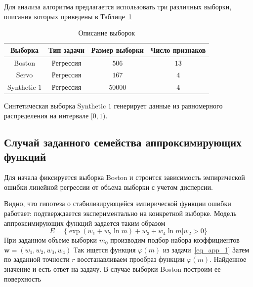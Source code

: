 \documentclass[12pt, twoside]{article}
\begin{document}
Для анализа алгоритма предлагается использовать три различных выборки, описания которых приведены в Таблице~\ref{table:sample}
\begin{table}[H]
\begin{center}
\caption{Описание выборок}
\begin{tabular}{|c|c|c|c|}
\hline
Выборка & Тип задачи & Размер выборки & Число признаков \\
\hline
Boston & Регрессия & $506$ & $13$ \\
\hline
Servo & Регрессия & $167$ & $4$ \\
\hline
Synthetic $1$ & Регрессия & $50000$ & $4$ \\
\hline
\end{tabular}
\label{table:sample}
\end{center}
\end{table}
Синтетическая выборка Synthetic $1$ генерирует данные из равномерного распределения на интервале $[0,1)$.
\subsection{Случай заданного семейства аппроксимирующих функций}
Для начала фиксируется выборка Boston и строится зависимость эмпирической ошибки линейной регрессии от объема выборки с учетом дисперсии. 

\begin{figure}[!htb]
\end{figure}

Видно, что гипотеза о стабилизирующейся эмпирической функции ошибки работает: подтверждается экспериментально на конкретной выборке.
Модель аппроксимирующих функций задается таким образом $$E = \{\exp(w_1 + w_2\ln m) + w_3 + w_4 \ln m | w_2 > 0\}$$ При заданном объеме выборки $m_0$ производим подбор набора коэффициентов $\textbf{w} = (w_1, w_2, w_3, w_4)$ Так ищется функция $\varphi(m)$ из задачи~\eqref{eq_app_1}
Затем по заданной точности $r$ восстанавливаем прообраз функции $\varphi(m)$. Найденное значение и есть ответ на задачу.
В случае выборки Boston построим ее поверхность 
\end{document}
